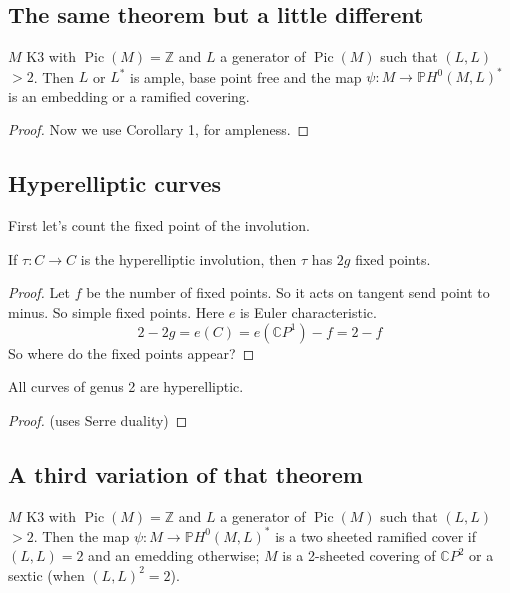 \subsection{The same theorem but a little different}

\begin{thm}\leavevmode
	$M$ K3 with $\operatorname{Pic}(M) =\mathbb{Z}$ and $L$ a generator of $\operatorname{Pic}(M)$ such that $(L,L)${\color{6}$>2$}. Then $L$ or $L^*$ is ample, base point free and the map $\psi:M\longrightarrow \mathbb{P}H^{0}(M,L)^*$ is an embedding or a ramified covering.
\end{thm}

\begin{proof}\leavevmode
	Now we use Corollary 1, for ampleness.
\end{proof}

\subsection{Hyperelliptic curves}

First let's count the fixed point of the involution.

\begin{lemma}\leavevmode
	If $\tau:C\to C$ is the hyperelliptic involution, then $\tau$ has $2g$ fixed points.
\end{lemma}

\begin{proof}\leavevmode
	Let $f$ be the number of fixed points. So it acts on tangent send point to minus. So simple fixed points. Here $e$ is Euler characteristic.
	\[2-2g=e(C)=e(\mathbb{C}P^{1})-f=2-f\]
	{\color{3}So where do the fixed points appear?}
\end{proof}

\begin{prop}\leavevmode
	All curves of genus 2 are hyperelliptic.
\end{prop}

\begin{proof}\leavevmode
	(uses Serre duality)
\end{proof}

\subsection{A third variation of that theorem}

\begin{thm}\leavevmode
	$M$ K3 with $\operatorname{Pic}(M) =\mathbb{Z}$ and $L$ a generator of $\operatorname{Pic}(M)$ such that $(L,L)${\color{6}$>2$}. Then the map $\psi:M\longrightarrow \mathbb{P}H^{0}(M,L)^*$ is a two sheeted ramified cover if $(L,L)=2$ and an emedding otherwise;  $M$ is a 2-sheeted covering of $\mathbb{C}P^{2}$ or a sextic (when $(L,L)^2=2$).
\end{thm}

